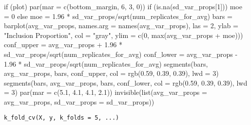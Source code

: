 \documentclass[a4paper]{book}
\begin{document}
\begin{Examples}
\begin{ExampleCode}
{    if (plot) {
        par(mar = c(bottom_margin, 6, 3, 0))
        if (is.na(sd_var_props[1])) {
            moe = 0
        }
        else {
            moe = 1.96 * sd_var_props/sqrt(num_replicates_for_avg)
        }
        bars = barplot(avg_var_props, names.arg = names(avg_var_props), 
            las = 2, ylab = "Inclusion Proportion", col = "gray", 
            ylim = c(0, max(avg_var_props + moe)))
        conf_upper = avg_var_props + 1.96 * sd_var_props/sqrt(num_replicates_for_avg)
        conf_lower = avg_var_props - 1.96 * sd_var_props/sqrt(num_replicates_for_avg)
        segments(bars, avg_var_props, bars, conf_upper, col = rgb(0.59, 
            0.39, 0.39), lwd = 3)
        segments(bars, avg_var_props, bars, conf_lower, col = rgb(0.59, 
            0.39, 0.39), lwd = 3)
        par(mar = c(5.1, 4.1, 4.1, 2.1))
    }
    invisible(list(avg_var_props = avg_var_props, sd_var_props = sd_var_props))
  }
\end{ExampleCode}
\end{Examples}
%
\begin{Usage}
\begin{verbatim}
k_fold_cv(X, y, k_folds = 5, ...)
\end{verbatim}
\end{Usage}
%
\begin{Arguments}
\begin{ldescription}
\item[\code{X}] 


\item[\code{y}] 


\item[\code{k\_folds}] 


\item[\code{...}] 


\end{ldescription}
\end{Arguments}
%
\end{document}

